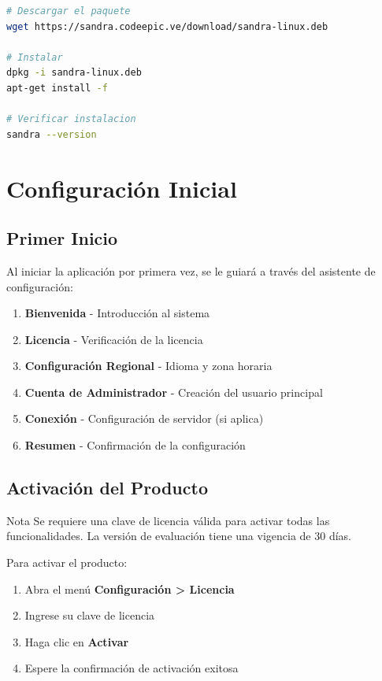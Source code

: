 \begin{lstlisting}[language=bash, caption=Instalacion via terminal]
# Descargar el paquete
wget https://sandra.codeepic.ve/download/sandra-linux.deb

# Instalar
dpkg -i sandra-linux.deb
apt-get install -f

# Verificar instalacion
sandra --version
\end{lstlisting}

\section{Configuración Inicial}

\subsection{Primer Inicio}

Al iniciar la aplicación por primera vez, se le guiará a través del asistente de configuración:

\begin{enumerate}
    \item \textbf{Bienvenida} - Introducción al sistema
    \item \textbf{Licencia} - Verificación de la licencia
    \item \textbf{Configuración Regional} - Idioma y zona horaria
    \item \textbf{Cuenta de Administrador} - Creación del usuario principal
    \item \textbf{Conexión} - Configuración de servidor (si aplica)
    \item \textbf{Resumen} - Confirmación de la configuración
\end{enumerate}

\subsection{Activación del Producto}

\begin{caja}{Nota}
Se requiere una clave de licencia válida para activar todas las funcionalidades. La versión de evaluación tiene una vigencia de 30 días.
\end{caja}

Para activar el producto:
\begin{enumerate}
    \item Abra el menú \textbf{Configuración > Licencia}
    \item Ingrese su clave de licencia
    \item Haga clic en \textbf{Activar}
    \item Espere la confirmación de activación exitosa
\end{enumerate}


